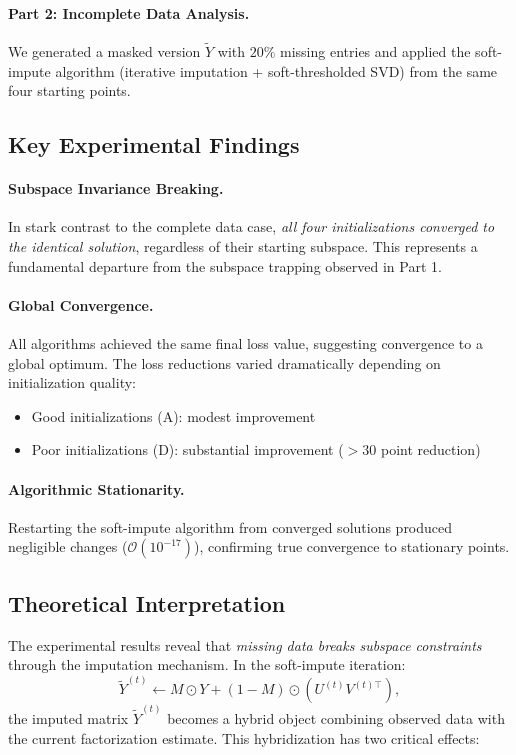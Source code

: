 \documentclass[11pt]{article}
\theoremstyle{spaced}
\begin{document}
\paragraph{Part 2: Incomplete Data Analysis.} 
We generated a masked version $\tilde{Y}$ with $20\%$ missing entries and applied the soft-impute algorithm (iterative imputation + soft-thresholded SVD) from the same four starting points.

\subsection*{Key Experimental Findings}

\paragraph{Subspace Invariance Breaking.}
In stark contrast to the complete data case, \emph{all four initializations converged to the identical solution}, regardless of their starting subspace. This represents a fundamental departure from the subspace trapping observed in Part 1.

\paragraph{Global Convergence.}
All algorithms achieved the same final loss value, suggesting convergence to a global optimum. The loss reductions varied dramatically depending on initialization quality:
\begin{itemize}[itemsep=1pt]
\item Good initializations (A): modest improvement
\item Poor initializations (D): substantial improvement ($> 30$ point reduction)
\end{itemize}

\paragraph{Algorithmic Stationarity.}
Restarting the soft-impute algorithm from converged solutions produced negligible changes ($\mathcal{O}(10^{-17})$), confirming true convergence to stationary points.

\subsection*{Theoretical Interpretation}

The experimental results reveal that \emph{missing data breaks subspace constraints} through the imputation mechanism. In the soft-impute iteration:
\[
\tilde{Y}^{(t)} \leftarrow M \odot Y + (1-M) \odot (U^{(t)} V^{(t)\top}),
\]
the imputed matrix $\tilde{Y}^{(t)}$ becomes a hybrid object combining observed data with the current factorization estimate. This hybridization has two critical effects:
\end{document}
